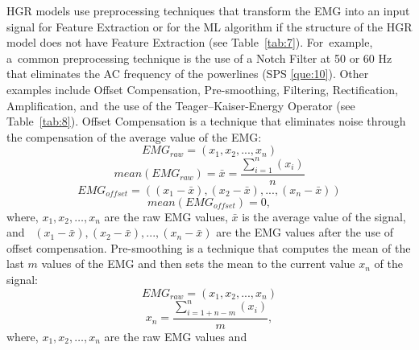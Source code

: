 \documentclass[sensors,review,accept,moreauthors,pdftex]{Definitions/mdpi}
\begin{document}
HGR models use preprocessing techniques that transform the EMG into an input signal for Feature Extraction or for the ML algorithm if the structure of the HGR model does not have Feature Extraction (see Table~\ref{tab:7}). For~example, a~common preprocessing technique is the use of a Notch Filter at 50 or 60 Hz that eliminates the AC frequency of the powerlines (SPS \ref{que:10}). Other examples include Offset Compensation, Pre-smoothing, Filtering, Rectification, Amplification, and~the use of the Teager--Kaiser-Energy Operator (see Table~\ref{tab:8}). Offset Compensation is a technique that eliminates noise through the compensation of the average value of the EMG:
\begin{equation}
EMG_{raw}=(x_1,x_2,...,x_n)
\end{equation}
\begin{equation}
mean(EMG_{raw})=\bar{x}=\frac{\sum_{i=1}^{n}(x_i)}{n}
\end{equation}
\begin{equation}
EMG_{offset}=((x_1-\bar{x}),(x_2-\bar{x}),...,(x_n-\bar{x}))
\end{equation}
\begin{equation}
mean(EMG_{offset})=0,
\end{equation}
where, 
\begin{math}
x_{1},x_{2},… ,x_{n}
\end{math}
are the raw EMG values,
\begin{math}
\bar{x}
\end{math} 
is the average value of the signal, and~
\begin{math}
(x_1-\bar{x}),(x_2-\bar{x}),...,(x_n-\bar{x})
\end{math}
are the EMG values after the use of offset compensation. Pre-smoothing is a technique that computes the mean of the last 
\begin{math}
m
\end{math}
values of the EMG and then sets the mean to the current value \begin{math}
x_n
\end{math}
of the signal:
\begin{equation}
EMG_{raw}=(x_1,x_2,...,x_n)
\end{equation}
\begin{equation}
x_n=\frac{\sum_{i=1+n-m}^{n}(x_i)}{m},
\end{equation}
where, 
\begin{math}
x_1,x_2,… ,x_n
\end{math}
are the raw EMG values and 
\end{document}
